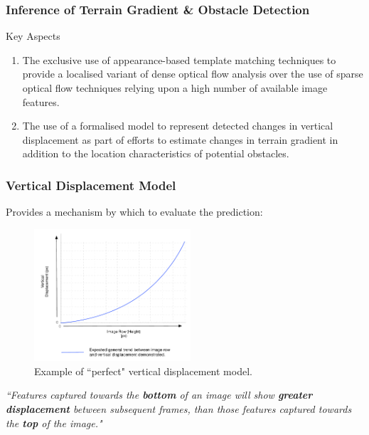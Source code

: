 \documentclass[10pt, compress]{beamer}
\begin{document}
\begin{frame}[fragile]
  \frametitle{Inference of Terrain Gradient \& Obstacle Detection}

  \begin{block}{Key Aspects}
   
  \begin{enumerate}[label={\arabic*.}]
  \item The exclusive use of appearance-based template matching techniques to provide a localised variant of dense optical flow analysis over the use of sparse optical flow techniques relying upon a high number of available image features.
  \item The use of a formalised model to represent detected changes in vertical displacement as part of efforts to estimate changes in terrain gradient in addition to the location characteristics of potential obstacles. 
\end{enumerate}
  
 \end{block}
 
\end{frame}

\begin{frame}[fragile]
  \frametitle{Vertical Displacement Model}
  
  \vspace{-35pt}

 Provides a mechanism by which to evaluate the prediction:
 
 \vspace{15pt}
 
       \begin{figure}
   \vspace{-30pt}
  \begin{center}
    \includegraphics[width=0.52\textwidth]{model.pdf}
  \end{center}
  \vspace{-15pt}
  \caption{Example of ``perfect" vertical displacement model.}
  \end{figure}
   
   
  \textit{``Features captured towards the \textbf{bottom} of an image will show \textbf{greater displacement} between subsequent frames, than those features captured towards the \textbf{top} of the image."}
   
\end{frame}
\end{document}
